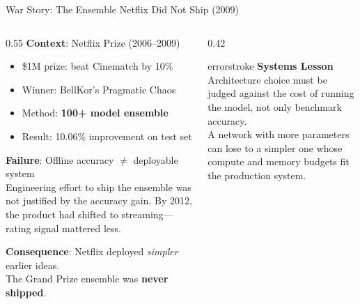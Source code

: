 \documentclass[aspectratio=169, 12pt]{beamer}
\begin{document}
\begin{frame}{War Story: The Ensemble Netflix Did Not Ship (2009)}
\footnotesize
\begin{columns}[T]
  \begin{column}{0.55\textwidth}
    \textbf{Context}: Netflix Prize (2006--2009)
    \begin{itemize}\setlength\itemsep{0pt}
      \item \$1M prize: beat Cinematch by 10\%
      \item Winner: BellKor's Pragmatic Chaos
      \item Method: \textbf{100+ model ensemble}
      \item Result: 10.06\% improvement on test set
    \end{itemize}

    \vspace{0.1cm}
    \textbf{Failure}: Offline accuracy $\neq$ deployable system\\
    {\footnotesize Engineering effort to ship the ensemble was not
    justified by the accuracy gain. By 2012, the product had
    shifted to streaming---rating signal mattered less.}

    \vspace{0.1cm}
    \textbf{Consequence}: Netflix deployed \emph{simpler} earlier ideas.\\
    The Grand Prize ensemble was \textbf{never shipped}.
  \end{column}
  \begin{column}{0.42\textwidth}
    \vspace{0.3cm}
    \begin{mlsyscard}{errorstroke}
    \textbf{Systems Lesson}\\[0.2cm]
    {\footnotesize Architecture choice must be judged against the \alert{cost
    of running the model}, not only benchmark accuracy.\\[0.2cm]
    A network with more parameters can lose to a simpler one whose compute
    and memory budgets fit the production system.}
    \end{mlsyscard}

    \vspace{0.2cm}
  \end{column}
\end{columns}

\end{frame}
\end{document}
